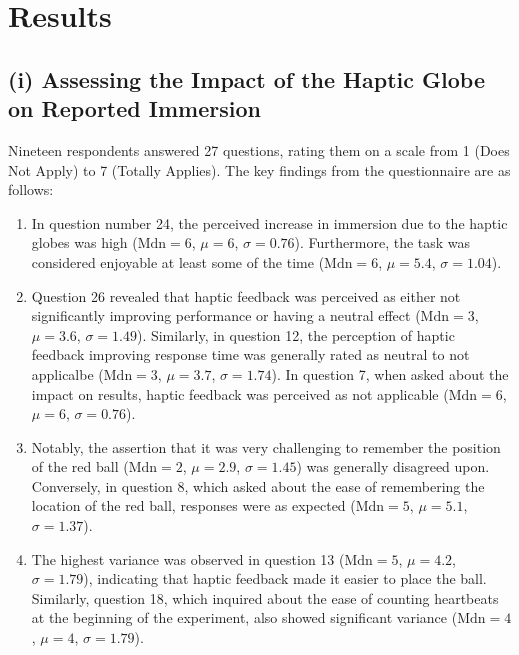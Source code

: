 \documentclass[12pt,oneside,openright]{report}
\begin{document}
    \section*{Results}
    \subsection*{(i) Assessing the Impact of the Haptic Globe on Reported Immersion}
    
    Nineteen respondents answered 27 questions, rating them on a scale from 1 (Does Not Apply) to 7 (Totally Applies). The key findings from the questionnaire are as follows:
    
    \begin{enumerate}
        \item In question number 24, the perceived increase in immersion due to the haptic globes was high ($\text{Mdn} = 6$, $\mu = 6$, $\sigma = 0.76$). Furthermore, the task was considered enjoyable at least some of the time ($\text{Mdn} = 6$, $\mu = 5.4$, $\sigma = 1.04$).
        
        \item Question 26 revealed that haptic feedback was perceived as either not significantly improving performance or having a neutral effect ($\text{Mdn} = 3$, $\mu = 3.6$, $\sigma = 1.49$). Similarly, in question 12, the perception of haptic feedback improving response time was generally rated as neutral to not applicalbe ($\text{Mdn} = 3$, $\mu = 3.7$, $\sigma = 1.74$). In question 7, when asked about the impact on results, haptic feedback was perceived as not applicable ($\text{Mdn} = 6$, $\mu = 6$, $\sigma = 0.76$).
    
        \item Notably, the assertion that it was very challenging to remember the position of the red ball ($\text{Mdn} = 2$, $\mu = 2.9$, $\sigma = 1.45$) was generally disagreed upon. Conversely, in question 8, which asked about the ease of remembering the location of the red ball, responses were as expected ($\text{Mdn} = 5$, $\mu = 5.1$, $\sigma = 1.37$).
    
        \item The highest variance was observed in question 13 ($\text{Mdn} = 5$, $\mu = 4.2$, $\sigma = 1.79$), indicating that haptic feedback made it easier to place the ball. Similarly, question 18, which inquired about the ease of counting heartbeats at the beginning of the experiment, also showed significant variance ($\text{Mdn} = 4$, $\mu = 4$, $\sigma = 1.79$). 
        
    \end{enumerate}
    
\end{document}
